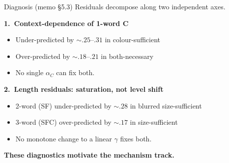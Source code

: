 \documentclass[10pt,aspectratio=169]{beamer}
\newcommand{\main}[1]{\textcolor{CSP-main-dark}{\textbf{#1}}}
\newcommand{\emp}[1]{\textcolor{CSP-emphasis}{\textbf{#1}}}
\begin{document}
\begin{frame}{Diagnosis (memo \S5.3)}
Residuals decompose along two independent axes.

\vspace{0.5em}
\main{1.~Context-dependence of 1-word C}
\begin{itemize}\itemsep0.1em
  \item Under-predicted by $\sim.25$--$.31$ in colour-sufficient
  \item Over-predicted by $\sim.18$--$.21$ in both-necessary
  \item No single $\alpha_C$ can fix both.
\end{itemize}

\vspace{0.5em}
\main{2.~Length residuals: saturation, not level shift}
\begin{itemize}\itemsep0.1em
  \item 2-word (SF) under-predicted by $\sim.28$ in blurred size-sufficient
  \item 3-word (SFC) over-predicted by $\sim.17$ in size-sufficient
  \item No monotone change to a linear $\gamma$ fixes both.
\end{itemize}

\vspace{0.5em}
\emp{These diagnostics motivate the mechanism track.}
\end{frame}
\end{document}
